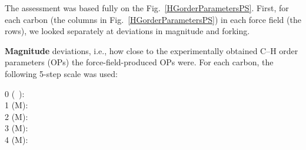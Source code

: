 \documentclass[journal=jpcbfk]{achemso}
\begin{document}
The assessment was based fully on the Fig.~\ref{HGorderParametersPS}.
%
First, for each carbon (the columns in Fig.~\ref{HGorderParametersPS}) in each force field (the rows),
we looked separately at deviations in magnitude and forking.

{\bf Magnitude} deviations, i.e., how close to the experimentally obtained C--H order parameters (OPs)
the force-field-produced OPs were.
%
For each carbon, the following 5-step scale was used:
%
\begin{description}
\item [0 (~):] 
%
\item [1 ({\textsf{\tiny M}}):] 
%
\item [2  ({\textsf{\small M}}):] 
%
\item [3 ({\textsf{\large M}}):] 
%
\item [4 ({\textsf{\Large M}}):] 
\end{description}
\end{document}
